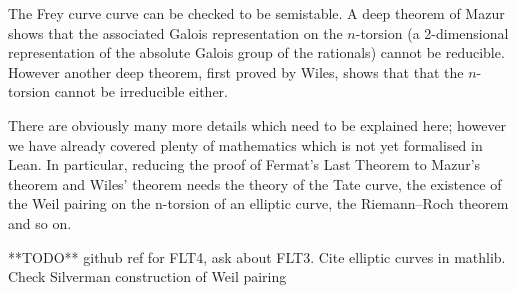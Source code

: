 The Frey curve curve can be checked to be semistable. A deep theorem of Mazur shows that the associated Galois representation on the $n$-torsion (a 2-dimensional representation of the absolute Galois group of the rationals) cannot be reducible. However another deep theorem, first proved by Wiles, shows that that the $n$-torsion cannot be irreducible either.

There are obviously many more details which need to be explained here; however we have already covered plenty of mathematics which is not yet formalised in Lean. In particular, reducing the proof of Fermat's Last Theorem to Mazur's theorem and Wiles' theorem needs the theory of the Tate curve, the existence of the Weil pairing on the n-torsion of an elliptic curve, the Riemann--Roch theorem and so on. 

**TODO** github ref for FLT4, ask about FLT3. Cite elliptic curves in mathlib. Check Silverman construction of Weil pairing 
